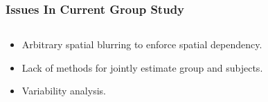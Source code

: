 \documentclass[serif]{beamer}
\begin{document}

\begin{frame}
\frametitle{Issues In Current Group Study}
\begin{columns}[t]
  \begin{column}{7cm}
    \begin{block}{}
      \begin{itemize}
      \item Arbitrary spatial blurring to enforce spatial dependency.
      \item Lack of methods for jointly estimate group and subjects.
      \item Variability analysis.
      \end{itemize}
      
    \end{block}
  \end{column}

  \begin{column}{3cm}
  \end{column}

\end{columns}
\end{frame}
\end{document}
